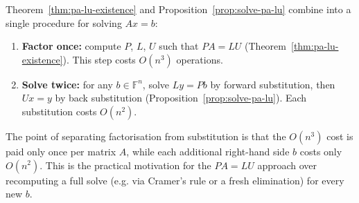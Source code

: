 		\begin{remark}[The $PA=LU$ Solution Method]
			\label{rem:pa-lu-method}
			Theorem~\ref{thm:pa-lu-existence} and Proposition~\ref{prop:solve-pa-lu} combine into a single procedure for solving $Ax=b$:
			
			\begin{enumerate}[label=\roman*.]
				\item \textbf{Factor once:} compute $P$, $L$, $U$ such that $PA = LU$ (Theorem~\ref{thm:pa-lu-existence}). This step costs $O(n^3)$ operations.
				\item \textbf{Solve twice:} for any $b \in \mathbb{F}^n$, solve $Ly = Pb$ by forward substitution, then $Ux = y$ by back substitution (Proposition~\ref{prop:solve-pa-lu}). Each substitution costs $O(n^2)$.
			\end{enumerate}
			
			The point of separating factorisation from substitution is that the $O(n^3)$ cost is paid only once per matrix $A$, while each additional right-hand side $b$ costs only $O(n^2)$. This is the practical motivation for the $PA=LU$ approach over recomputing a full solve (e.g. via Cramer's rule or a fresh elimination) for every new $b$.
		\end{remark}
		
